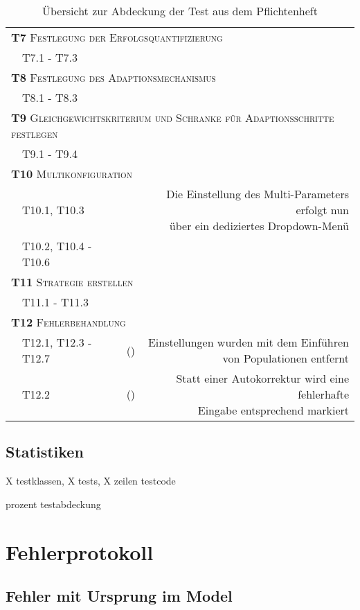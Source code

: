 \documentclass[parskip=full,11pt,openany]{scrreprt}
\newcommand{\cmark}{\ding{51}}%
\newcommand{\xmark}{\ding{55}}%
\begin{document}
\begin{table}[h]
\begin{tabular}{@{}ll|c|r@{}}
		\multicolumn{4}{l}{\small \textsc{\textbf{T7} Festlegung der Erfolgsquantifizierung}}\\ 
		&T7.1 - T7.3 & \cmark & \\
		\multicolumn{4}{l}{\small \textsc{\textbf{T8} Festlegung des Adaptionsmechanismus}}\\ 
		&T8.1 - T8.3 & \cmark & \\
		\multicolumn{4}{l}{\small \textsc{\textbf{T9} Gleichgewichtskriterium und Schranke für Adaptionsschritte festlegen}}\\ 
		&T9.1 - T9.4 & \cmark & \\
		\multicolumn{3}{l|}{\small \textsc{\textbf{T10} Multikonfiguration}}\\ 
		&T10.1, T10.3 & \cmark & \makecell{Die Einstellung des Multi-Parameters erfolgt nun\\ über ein dediziertes Dropdown-Menü}\\
		&T10.2, T10.4 - T10.6 & \cmark & \\
		\multicolumn{3}{l|}{\small \textsc{\textbf{T11} Strategie erstellen}}\\
		&T11.1 - T11.3 & \cmark & \\
		\multicolumn{3}{l|}{\small \textsc{\textbf{T12} Fehlerbehandlung}}\\ 
		&T12.1, T12.3 - T12.7 & (\xmark) & \makecell{Einstellungen wurden mit dem Einführen\\ von Populationen entfernt}\\
		&T12.2 & (\cmark) & \makecell{Statt einer Autokorrektur wird eine fehlerhafte\\ Eingabe entsprechend markiert}\\
		\bottomrule
	\end{tabular}
	\caption{Übersicht zur Abdeckung der Test aus dem Pflichtenheft}
\end{table}

\section{Statistiken}

X testklassen, X tests, X zeilen testcode

prozent testabdeckung

\chapter{Fehlerprotokoll}

\section{Fehler mit Ursprung im Model}
\end{document}
